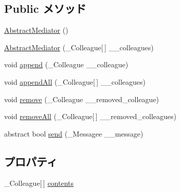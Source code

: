 \subsection*{Public メソッド}
\begin{DoxyCompactItemize}
\item 
\hyperlink{classlazurite_1_1pattern_1_1mediators_1_1_abstract_mediator_3_01___colleague_00_01___messagee_01_4_a72f12600a5611014b2773ec637f79851}{AbstractMediator} ()
\item 
\hyperlink{classlazurite_1_1pattern_1_1mediators_1_1_abstract_mediator_3_01___colleague_00_01___messagee_01_4_aa200e399a08bc6a8b0c765a205f39b09}{AbstractMediator} (\_\-Colleague\mbox{[}$\,$\mbox{]} \_\-\_\-colleagues)
\item 
void \hyperlink{classlazurite_1_1pattern_1_1mediators_1_1_abstract_mediator_3_01___colleague_00_01___messagee_01_4_a75e131257e618fe1179efcb4d6b117fe}{append} (\_\-Colleague \_\-\_\-colleague)
\item 
void \hyperlink{classlazurite_1_1pattern_1_1mediators_1_1_abstract_mediator_3_01___colleague_00_01___messagee_01_4_a0064ee99fdcea9cc60a204bcb60ab55b}{appendAll} (\_\-Colleague\mbox{[}$\,$\mbox{]} \_\-\_\-colleagues)
\item 
void \hyperlink{classlazurite_1_1pattern_1_1mediators_1_1_abstract_mediator_3_01___colleague_00_01___messagee_01_4_ab96e1fc164c5681a0ef3d950434c69e7}{remove} (\_\-Colleague \_\-\_\-removed\_\-colleague)
\item 
void \hyperlink{classlazurite_1_1pattern_1_1mediators_1_1_abstract_mediator_3_01___colleague_00_01___messagee_01_4_acbc1ecdf4cc271a5793a7631bb692741}{removeAll} (\_\-Colleague\mbox{[}$\,$\mbox{]} \_\-\_\-removed\_\-colleagues)
\item 
abstract bool \hyperlink{classlazurite_1_1pattern_1_1mediators_1_1_abstract_mediator_3_01___colleague_00_01___messagee_01_4_a06ede4a2f26fa304a000175ecad68c9c}{send} (\_\-Messagee \_\-\_\-message)
\end{DoxyCompactItemize}
\subsection*{プロパティ}
\begin{DoxyCompactItemize}
\item 
\_\-Colleague\mbox{[}$\,$\mbox{]} \hyperlink{classlazurite_1_1pattern_1_1mediators_1_1_abstract_mediator_3_01___colleague_00_01___messagee_01_4_ab18acb9b8868a428e77759e5274ac786}{contents}
\end{DoxyCompactItemize}


